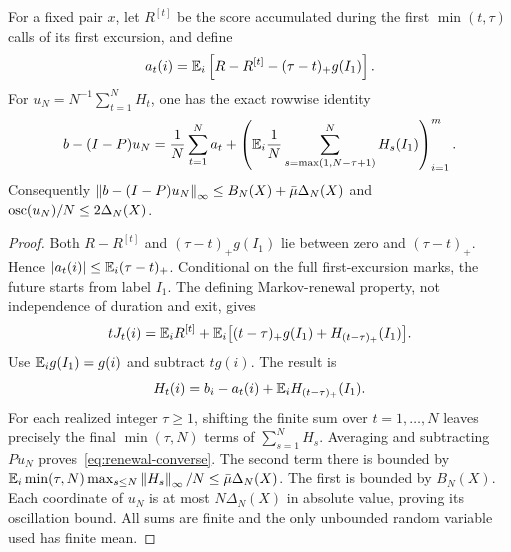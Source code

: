 \begin{lemma}\label{lem:renewal-converse}
For a fixed pair $x$, let $R^{[t]}$ be the score accumulated during the first $\min(t,\tau)$ calls of its first excursion, and define
\[
 a_t(i)=\mathbb E_i\left[R-R^{[t]}-(\tau-t)_+g(I_1)\right].
\]
For $u_N=N^{-1}\sum_{t=1}^NH_t$, one has the exact rowwise identity
\begin{equation}\label{eq:renewal-converse}
 b-(I-P)u_N
 =\frac1N\sum_{t=1}^Na_t
  +\left(\mathbb E_i\frac1N
       \sum_{s=\max(1,N-\tau+1)}^NH_s(I_1)\right)_{i=1}^m.
\end{equation}
Consequently $\left\lVert b-(I-P)u_N\right\rVert_\infty\le B_N(X)+\bar\mu\Delta_N(X)$ and $\operatorname{osc}(u_N)/N\le2\Delta_N(X)$.
\end{lemma}
\begin{proof}
Both $R-R^{[t]}$ and $(\tau-t)_+g(I_1)$ lie between zero and $(\tau-t)_+$. Hence $|a_t(i)|\le\mathbb E_i(\tau-t)_+$. Conditional on the full first-excursion marks, the future starts from label $I_1$. The defining Markov-renewal property, not independence of duration and exit, gives
\[
 tJ_t(i)=\mathbb E_iR^{[t]}+
     \mathbb E_i\bigl[(t-\tau)_+g(I_1)+H_{(t-\tau)_+}(I_1)\bigr].
\]
Use $\mathbb E_i g(I_1)=g(i)$ and subtract $tg(i)$. The result is
\[
 H_t(i)=b_i-a_t(i)+\mathbb E_iH_{(t-\tau)_+}(I_1).
\]
For each realized integer $\tau\ge1$, shifting the finite sum over $t=1,\ldots,N$ leaves precisely the final $\min(\tau,N)$ terms of $\sum_{s=1}^NH_s$. Averaging and subtracting $Pu_N$ proves~\eqref{eq:renewal-converse}. The second term there is bounded by
$\mathbb E_i\min(\tau,N)\max_{s\le N}\left\lVert H_s\right\rVert_\infty/N\le\bar\mu\Delta_N(X)$.
The first is bounded by $B_N(X)$. Each coordinate of $u_N$ is at most $N\Delta_N(X)$ in absolute value, proving its oscillation bound. All sums are finite and the only unbounded random variable used has finite mean.
\end{proof}

